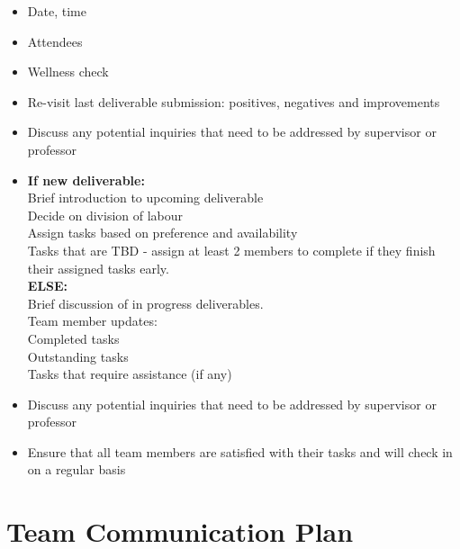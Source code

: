 \documentclass{article}
\begin{document}
\begin{itshape}
  \begin{flushleft}
    \begin{itemize}
      \item Date, time   
      \item Attendees 
      \item Wellness check 
      \item Re-visit last deliverable submission: positives, negatives and improvements \\
      \item Discuss any potential inquiries that need to be addressed by supervisor or professor \\
      \item \textbf{If new deliverable:}  \\
      Brief introduction to upcoming deliverable \\
      Decide on division of labour \\
      Assign tasks based on preference and availability \\
      Tasks that are TBD - assign at least 2 members to complete if they finish their assigned tasks early. \\
  \textbf{ELSE:} \\
  Brief discussion of in progress deliverables. \\
  Team member updates:\\
  \hspace{0.5cm}
  Completed tasks \\
  \hspace{0.5cm}
  Outstanding tasks \\
  \hspace{0.5cm}
  Tasks that require assistance (if any)\\
  
      \item Discuss any potential inquiries that need to be addressed by supervisor or professor \\
      \item Ensure that all team members are satisfied with their tasks and will check in on a regular basis 
     \end{itemize}

  \end{flushleft}
\end{itshape}




\section{Team Communication Plan}
\end{document}
